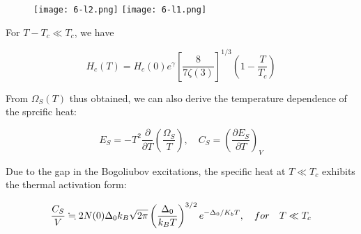 \begin{wrapfigure}{l}{6cm}
\texttt{[image: 6-l2.png]}
\texttt{[image: 6-l1.png]}
\end{wrapfigure}



For $T-T_c\ll T_c$, we have

\[H_c(T)=H_c(0)e^\gamma \left[\frac{8}{7\zeta(3)}\right]^{1/3}\left(1-\frac{T}{T_c}\right) \]

From $\Omega_S(T)$ thus obtained, we can also derive the temperature dependence of the sprcific heat:

\[E_S=-T^2\frac{\partial}{\partial T}\left(\frac{\Omega_S}{T}\right),\quad C_S=\left(\frac{\partial E_S}{\partial T}\right)_V \]

Due to the gap in the Bogoliubov excitations, the specific heat at $T\ll T_c$ exhibits the thermal activation form:

\[\frac{C_S}{V}\fallingdotseq 2N(0)\Delta_0 k_B\sqrt{2\pi}\left(\frac{\Delta_0}{k_B T}\right)^{3/2}e^{-\Delta_0/K_bT},\quad for\quad T\ll T_c \]


